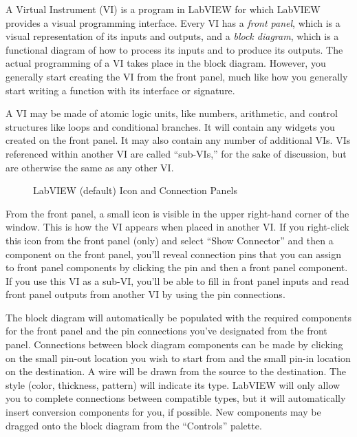 A Virtual Instrument (VI) is a program in LabVIEW for which LabVIEW provides a visual programming interface.  Every VI has a \textit{front panel}, which is a visual representation of its inputs and outputs, and a \textit{block diagram}, which is a functional diagram of how to process its inputs and to produce its outputs.  The actual programming of a VI takes place in the block diagram.  However, you generally start creating the VI from the front panel, much like how you generally start writing a function with its interface or signature.

A VI may be made of atomic logic units, like numbers, arithmetic, and control structures like loops and conditional branches.  It will contain any widgets you created on the front panel.  It may also contain any number of additional VIs.  VIs referenced within another VI are called ``sub-VIs,'' for the sake of discussion, but are otherwise the same as any other VI.

\begin{figure}[htbp]
  \centering
   \quad
  \caption{LabVIEW (default) Icon and Connection Panels}
  \label{fig:eq_labview:block_diagram:icon}
\end{figure}
From the front panel, a small icon is visible in the upper right-hand corner of the window.  This is how the VI appears when placed in another VI.  If you right-click this icon from the front panel (only) and select ``Show Connector'' and then a component on the front panel, you'll reveal connection pins that you can assign to front panel components by clicking the pin and then a front panel component.  If you use this VI as a sub-VI, you'll be able to fill in front panel inputs and read front panel outputs from another VI by using the pin connections.

The block diagram will automatically be populated with the required components for the front panel and the pin connections you've designated from the front panel.  Connections between block diagram components can be made by clicking on the small pin-out location you wish to start from and the small pin-in location on the destination.  A wire will be drawn from the source to the destination.  The style (color, thickness, pattern) will indicate its type.  LabVIEW will only allow you to complete connections between compatible types, but it will automatically insert conversion components for you, if possible.  New components may be dragged onto the block diagram from the ``Controls'' palette.

